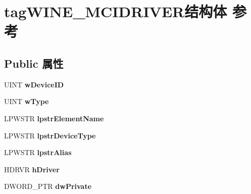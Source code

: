 \hypertarget{structtag_w_i_n_e___m_c_i_d_r_i_v_e_r}{}\section{tag\+W\+I\+N\+E\+\_\+\+M\+C\+I\+D\+R\+I\+V\+E\+R结构体 参考}
\label{structtag_w_i_n_e___m_c_i_d_r_i_v_e_r}
\subsection*{Public 属性}
\begin{DoxyCompactItemize}
\item 
\mbox{\label{structtag_w_i_n_e___m_c_i_d_r_i_v_e_r_a8dea8b89568db615b6ddaced3f3ca889}} 
U\+I\+NT {\bfseries w\+Device\+ID}
\item 
\mbox{\label{structtag_w_i_n_e___m_c_i_d_r_i_v_e_r_a2915befd343a9c7cfe8b25a35d0dde04}} 
U\+I\+NT {\bfseries w\+Type}
\item 
\mbox{\label{structtag_w_i_n_e___m_c_i_d_r_i_v_e_r_a33f449b69a15d5e99496c67fb4e67a01}} 
L\+P\+W\+S\+TR {\bfseries lpstr\+Element\+Name}
\item 
\mbox{\label{structtag_w_i_n_e___m_c_i_d_r_i_v_e_r_acd82bfbc4ec2fa4ed42bbf126c2fb736}} 
L\+P\+W\+S\+TR {\bfseries lpstr\+Device\+Type}
\item 
\mbox{\label{structtag_w_i_n_e___m_c_i_d_r_i_v_e_r_ad73c6035384c7a2f9f387ee7aef7142f}} 
L\+P\+W\+S\+TR {\bfseries lpstr\+Alias}
\item 
\mbox{\label{structtag_w_i_n_e___m_c_i_d_r_i_v_e_r_a4aada9059f4adc217c924d4a925d1edd}} 
H\+D\+R\+VR {\bfseries h\+Driver}
\item 
\mbox{\label{structtag_w_i_n_e___m_c_i_d_r_i_v_e_r_a3a08ef7dbe6dc63cca4f36e4ff77055e}} 
D\+W\+O\+R\+D\+\_\+\+P\+TR {\bfseries dw\+Private}
\item 
\mbox{\label{structtag_w_i_n_e___m_c_i_d_r_i_v_e_r_ae0a1a0a2e5b325220a1b8bcc42c9dc38}} 

\end{DoxyCompactItemize}
